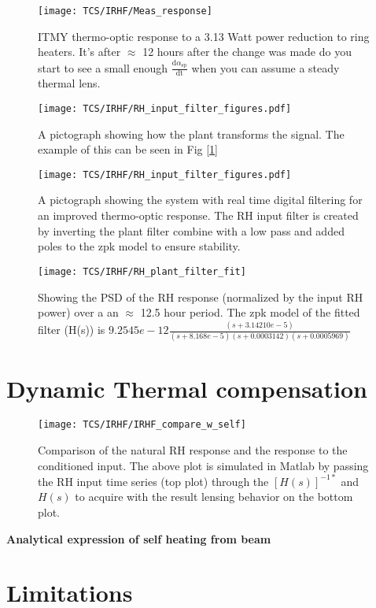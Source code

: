\begin{figure}[H]
 \texttt{[image: TCS/IRHF/Meas\_response]}
 \caption{ITMY thermo-optic response to a 3.13 Watt power reduction to ring heaters. It's after $\approx$ 12 hours after the change was made do you start to see a small enough $\frac{\mathrm{d} \alpha_\mathrm{sp}}{\mathrm{dt}}$ when you can assume a steady thermal lens.}
 \label{fig:meas}
\end{figure}


\begin{figure}[H]
\texttt{[image: TCS/IRHF/RH\_input\_filter\_figures.pdf]}
\caption{A pictograph showing how the plant transforms the signal. The example of this can be seen in Fig [\ref{fig:meas}]}
\label{fig:justplant}
\end{figure}

\begin{figure}[H]
\texttt{[image: TCS/IRHF/RH\_input\_filter\_figures.pdf]}
\caption{A pictograph showing the system with real time digital filtering for an improved thermo-optic response. The RH input filter is created by inverting the plant filter combine with a low pass and added poles to the zpk model to ensure stability.}
\label{fig:plantwfilt}
\end{figure}

\begin{figure}[H]
\texttt{[image: TCS/IRHF/RH\_plant\_filter\_fit]}
\caption{Showing the PSD of the RH response (normalized by the input RH power) over a an $\approx$ 12.5 hour period. The zpk model of the fitted filter (H(s)) is $9.2545e-12 \frac{(s+3.14210e-5)}{(s+8.168e-5)(s+0.0003142)(s+0.0005969)}$}
\label{fig:plant_v_fit}
\end{figure}

\section{Dynamic Thermal compensation}
\begin{figure}[H]
\texttt{[image: TCS/IRHF/IRHF\_compare\_w\_self]}
\caption{Comparison of the natural RH response and the response to the conditioned input. The above plot is simulated in Matlab by passing the RH input time series (top plot) through the $[H(s)]^{-1*}$ and $H(s)$ to acquire with the result lensing behavior on the bottom plot.}
\label{fig:dynam_comparison}
\end{figure}
\newpage

\textbf{Analytical expression of self heating from beam} \cite{hello_vinet}

\section{Limitations}
